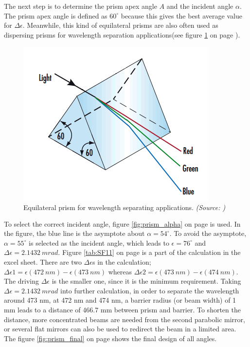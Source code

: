 The next step is to determine the prism apex angle $A$ and the incident angle $\alpha$. The prism apex angle is defined as $60^\circ$ because this gives the best average value for $\Delta\epsilon$. Meanwhile, this kind of equilateral prisms are also often used as dispersing prisms for wavelength separation applications(see figure \ref{fig:prism_equilateral} on page \pageref{fig:prism_equilateral}). 

\begin{figure}[ht!]
\centering
\includegraphics[scale = 0.8]{chapters/img/prism_equilateral.png}
\caption{Equilateral prism for wavelength separating applications. \emph{(Source: \cite{prism_material})}}
\label{fig:prism_equilateral}
\end{figure}

To select the correct incident angle, figure \ref{fig:prism_alpha} on page \pageref{fig:prism_alpha} is used. In the figure, the blue line is the asymptote about $\alpha = 54^\circ$. To avoid the asymptote, $\alpha = 55^\circ$ is selected as the incident angle, which leads to $\epsilon = 76^\circ$ and $\Delta\epsilon = 2.1432\ mrad$. Figure \ref{tab:SF11} on page \pageref{tab:SF11} is a part of the calculation in the excel sheet. There are two $\Delta\epsilon$s in the calculation; $\Delta\epsilon1 = \epsilon(472\ nm) - \epsilon(473\ nm)$ whereas $\Delta\epsilon2 = \epsilon(473\ nm) - \epsilon(474\ nm)$. The driving $\Delta\epsilon$ is the smaller one, since it is the minimum requirement. Taking $\Delta\epsilon = 2.1432\ mrad$ into further calculation, in order to separate the wavelength around 473 nm, at 472 nm and 474 nm, a barrier radius (or beam width) of 1 mm leads to a distance of 466.7 mm between prism and barrier. To shorten the distance, more concentrated beams are needed from the second parabolic mirror, or several flat mirrors can also be used to redirect the beam in a limited area. The figure \ref{fig:prism_final} on page \pageref{fig:prism_final} shows the final design of all angles.

